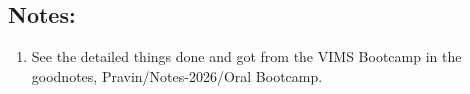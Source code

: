 \subsection*{Notes:}
\begin{enumerate}
    \item See the detailed things done and got from the VIMS Bootcamp in the goodnotes, Pravin/Notes-2026/Oral Bootcamp.
\end{enumerate}



